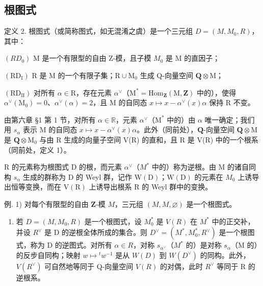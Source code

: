 \subsection{根图式}

定义 2. 根图式（或简称图式，如无混淆之虞）是一个三元组 \(D = (M, M_{0}, R)\)，其中：

\((RD_{0})\) M 是一个有限型的自由 Z-模，且子模 \(M_{0}\) 是 M 的直因子；

\((\mathrm{RD}_{\mathrm{I}})\) R 是 M 的一个有限子集；\(\mathrm{R} \cup \mathrm{M}_0\) 生成 Q-向量空间 \(\mathbf{Q} \otimes \mathrm{M}\)；

\((\mathrm{RD}_{\mathrm{II}})\) 对所有 \(\alpha \in \mathrm{R}\)，存在元素 \(\alpha^{\vee}\)（\(\mathrm{M}^{*} = \mathrm{Hom}_{\mathbf{Z}}(\mathrm{M}, \mathbf{Z})\) 中的），使得 \(\alpha^{\vee}(\mathrm{M}_{0}) = 0\)、\(\alpha^{\vee}(\alpha) = 2\)，且 M 的自同态 \(x \mapsto x - \alpha^{\vee}(x)\alpha\) 保持 R 不变。

由第六章 §1 第 1 节，对所有 \(\alpha \in \mathbb{R}\)，元素 \(\alpha^{\vee}\)（\(\mathrm{M}^*\) 中的）由 \(\alpha\) 唯一确定；我们用 \(s_{\alpha}\) 表示 M 的自同态 \(x \mapsto x - \alpha^{\vee}(x)\alpha\)。此外（同前处），\(\mathbf{Q}\)-向量空间 \(\mathbf{Q} \otimes \mathrm{M}\) 是 \(\mathbf{Q} \otimes \mathrm{M}_0\) 与由 R 生成的向量子空间 V(R) 的直和，且 R 是 V(R) 中的一个根系（同前处，定义 1）。

R 的元素称为根图式 D 的根，而元素 \(\alpha^{\vee}\)（\(M^{*}\) 中的）称为逆根。由 M 的诸自同构 \(s_{\alpha}\) 生成的群称为 D 的 Weyl 群，记作 \(\mathrm{W(D)}\)；\(\mathrm{W(D)}\) 的元素在 \(M_{0}\) 上诱导出恒等变换，而在 \(\mathrm{V(R)}\) 上诱导出根系 R 的 Weyl 群中的变换。

例. 1) 对每个有限型的自由 \(\mathbf{Z}\)-模 \(M\)，三元组 \((M, M, \varnothing)\) 是一个根图式。

\begin{enumerate}
\def\labelenumi{\arabic{enumi})}
\setcounter{enumi}{1}
\tightlist
\item
  若 \(D = (M, M_{0}, R)\) 是一个根图式，设 \(M_{0}^{*}\) 是 \(V(R)\) 在 \(M^{*}\) 中的正交补，并设 \(R^{\vee}\) 是 D 的逆根全体所成的集合。则 \(D^{\vee} = (M^{*}, M_{0}^{*}, R^{\vee})\) 是一个根图式，称为 D 的逆图式。对所有 \(\alpha \in R\)，对称 \(s_{\alpha^{\vee}}\)（\(M^{*}\) 的）是对称 \(s_{\alpha}\)（M 的）的反步自同构；映射 \(w \mapsto {}^{t} w^{-1}\) 是从 \(W(D)\) 到 \(W(D^{\vee})\) 的同构。此外，\(V(R^{\vee})\) 可自然地等同于 Q-向量空间 \(V(R)\) 的对偶，此时 \(R^{\vee}\) 等同于 R 的逆根系。
\end{enumerate}

